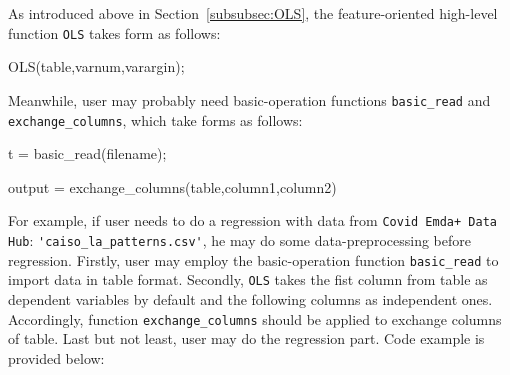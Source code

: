 \documentclass[10pt]{article}
\numberwithin{equation}{section}
\numberwithin{table}{section}
\numberwithin{figure}{section}
\begin{document}
As introduced above in Section~\ref{subsubsec:OLS}, the feature-oriented high-level function \verb!OLS! takes form as follows:

\begin{Command}
OLS(table,varnum,varargin);
\end{Command}

Meanwhile, user may probably need basic-operation functions \verb!basic_read! and \verb!exchange_columns!, which take forms as follows:

\begin{Command}
t = basic_read(filename);
\end{Command}

\begin{Command}
output = exchange_columns(table,column1,column2)
\end{Command}

For example, if user needs to do a regression with data from \verb!Covid Emda+ Data Hub!: \verb!'caiso_la_patterns.csv'!, he may do some data-preprocessing before regression. Firstly, user may employ the basic-operation function \verb!basic_read! to import data in table format. Secondly, \verb!OLS! takes the fist column from table as dependent variables by default and the following columns as independent ones. Accordingly, function \verb!exchange_columns! should be applied to exchange columns of table. Last but not least, user may do the regression part. Code example is provided below:
\end{document}
